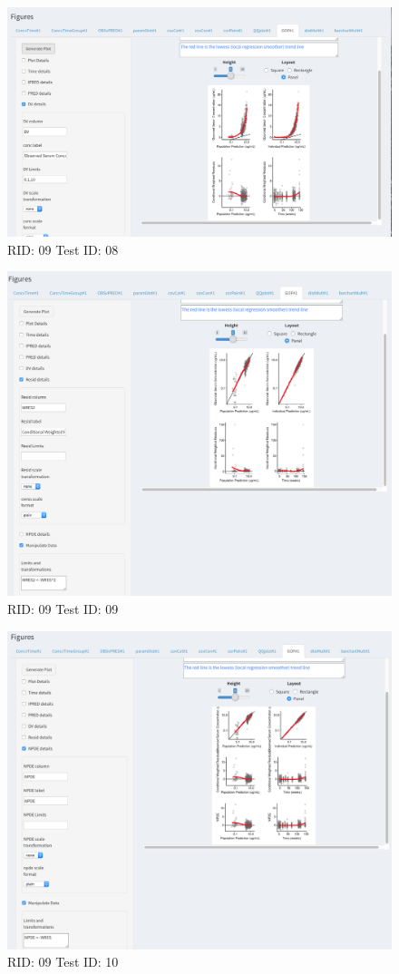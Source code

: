 \begin{figure}[H]
\includegraphics[width=.8\textwidth]{screencaps/09-08-1.png}
\caption{RID: 09 Test ID: 08}
\end{figure}
\begin{figure}[H]
\includegraphics[width=.8\textwidth]{screencaps/09-09-1.png}
\caption{RID: 09 Test ID: 09}
\end{figure}
\begin{figure}[H]
\includegraphics[width=.8\textwidth]{screencaps/09-10-1.png}
\caption{RID: 09 Test ID: 10}
\end{figure}
